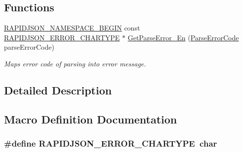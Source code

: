 \subsection*{Functions}
\begin{DoxyCompactItemize}
\item 
\hyperlink{group___r_a_p_i_d_j_s_o_n___c_o_n_f_i_g_gad3806c8251fdc7da9618b7e922674ffc}{R\+A\+P\+I\+D\+J\+S\+O\+N\+\_\+\+N\+A\+M\+E\+S\+P\+A\+C\+E\+\_\+\+B\+E\+G\+IN} const \hyperlink{group___r_a_p_i_d_j_s_o_n___e_r_r_o_r_s_ga7e4636fd48d0148f102b8a13f0539d8c}{R\+A\+P\+I\+D\+J\+S\+O\+N\+\_\+\+E\+R\+R\+O\+R\+\_\+\+C\+H\+A\+R\+T\+Y\+PE} $\ast$ \hyperlink{group___r_a_p_i_d_j_s_o_n___e_r_r_o_r_s_ga28835eb93d2c3c07bbea13515eb31415}{Get\+Parse\+Error\+\_\+\+En} (\hyperlink{group___r_a_p_i_d_j_s_o_n___e_r_r_o_r_s_ga8d4b32dfc45840bca189ade2bbcb6ba7}{Parse\+Error\+Code} parse\+Error\+Code)
\begin{DoxyCompactList}\small\item\em Maps error code of parsing into error message. \end{DoxyCompactList}\end{DoxyCompactItemize}


\subsection{Detailed Description}


\subsection{Macro Definition Documentation}
\subsubsection[{\texorpdfstring{R\+A\+P\+I\+D\+J\+S\+O\+N\+\_\+\+E\+R\+R\+O\+R\+\_\+\+C\+H\+A\+R\+T\+Y\+PE}{RAPIDJSON_ERROR_CHARTYPE}}]{\setlength{\rightskip}{0pt plus 5cm}\#define R\+A\+P\+I\+D\+J\+S\+O\+N\+\_\+\+E\+R\+R\+O\+R\+\_\+\+C\+H\+A\+R\+T\+Y\+PE~char}\hypertarget{group___r_a_p_i_d_j_s_o_n___e_r_r_o_r_s_ga7e4636fd48d0148f102b8a13f0539d8c}{}\label{group___r_a_p_i_d_j_s_o_n___e_r_r_o_r_s_ga7e4636fd48d0148f102b8a13f0539d8c}


